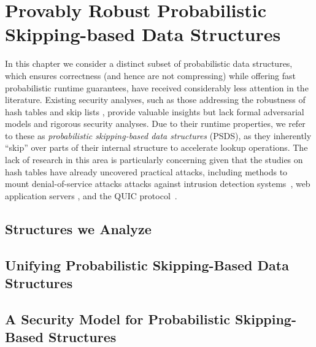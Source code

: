 \chapter{Provably Robust Probabilistic Skipping-based Data Structures}\label{chap:psds}

In this chapter we consider a distinct subset of probabilistic data structures, which ensures correctness (and hence are not compressing) while offering fast probabilistic runtime guarantees, have received considerably less attention in the literature. Existing security analyses, such as those addressing the robustness of hash tables \cite{CrosbyW03, aumasson2012hash, bar2007remote, eckhoff2009hash,klink2011efficient,bottinelli2025hash} and skip lists \cite{nussbaum2019skiplist}, provide valuable insights but lack formal adversarial models and rigorous security analyses. Due to their runtime properties, we refer to these as \emph {probabilistic skipping-based data structures} (PSDS), as they inherently ``skip'' over parts of their internal structure to accelerate lookup operations.
The lack of research in this area is particularly concerning given that the studies on hash tables have already uncovered practical attacks, including methods to mount denial-of-service attacks attacks against intrusion detection systems~\cite{bar2007remote}, web application servers \cite{klink2011efficient}, and the QUIC protocol~\cite{bottinelli2025hash}.


\section{Structures we Analyze}


\section{Unifying Probabilistic Skipping-Based Data Structures}


\section{A Security Model for Probabilistic Skipping-Based Structures}


